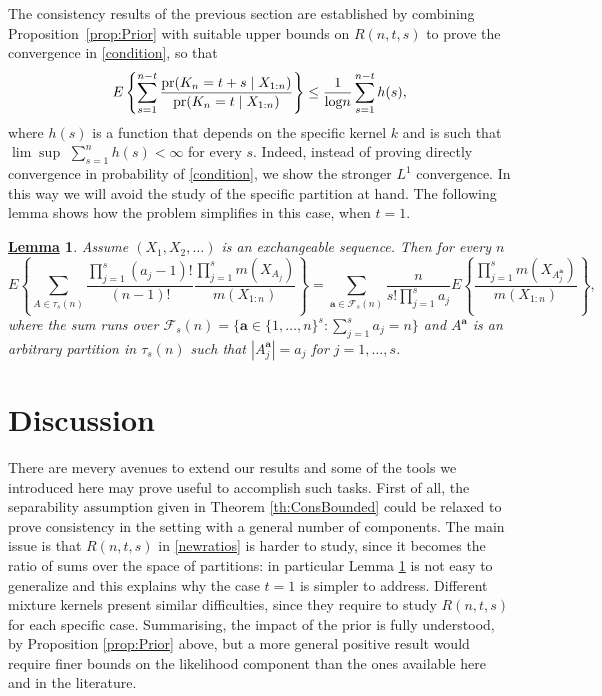 \documentclass[12pt]{article}
\newtheorem{Lem}{\underline{\bf Lemma}}
\def\log{\hbox{log}}
\begin{document}
The consistency results of the previous section are established by combining Proposition~\ref{prop:Prior} with suitable upper bounds on $R(n,t,s)$ to prove the convergence in \eqref{condition}, so that
\[
E \left\{ \sum_{s = 1}^{n-t} \frac{\text{\rm pr}(K_n = t+s \mid X_{1:n})}{\text{\rm pr}(K_n = t \mid X_{1:n})} \right\} \leq \frac{1}{\log n} \sum_{s = 1}^{n-t}h(s),
\]
where $h(s)$ is a %
function that depends on the specific kernel $k$ and is such that $\lim \sup$ $\sum_{s = 1}^{n}h(s) < \infty$ for every $s$. Indeed, instead of proving directly convergence in probability of \eqref{condition}, we show %
the stronger $L^1$ convergence. %
In this way we will avoid the study of the specific partition at hand. The following lemma shows how the problem simplifies in this case, when $t = 1$.
\begin{Lem}\label{suff_expectation}
Assume $(X_1,X_2,\dots)$ is an exchangeable sequence. Then for every $n$
\begin{equation*}
	E\left\{\sum_{A \in \tau_s(n)}\frac{\prod_{j=1}^s(a_j-1)!}{(n-1)!}\frac{\prod_{j=1}^s m(X_{A_j})}{m(X_{1:n})} \right\} = \sum_{\bm{a} \in \mathcal{F}_s(n)} \frac{n}{s! \prod_{j=1}^{s} a_j}  E\left\{ \frac{\prod_{j=1}^s m(X_{A^{\bm{a}}_j})}{m(X_{1:n})} \right\},
\end{equation*}
where the sum runs over $\mathcal{F}_s(n) = \{ \bm{a} \in \{1,\ldots,n\}^s: \sum_{j = 1}^s a_j=n\}$ and $A^{\bm{a}}$ is an arbitrary partition in $\tau_s(n)$ such that $|A_j^{\bm{a}}| = a_j$ for $j=1,\dots,s$. 
\end{Lem}
\section{Discussion}\label{discussion}
There are mevery avenues to extend our results and some of the tools we introduced here may prove useful to accomplish such tasks. First of all, 
the separability assumption given in Theorem \ref{th:ConsBounded} could be relaxed to prove consistency in the setting with a general number of components. The main issue is that $R(n,t,s)$ in \eqref{newratios} is harder to study, since it becomes the ratio of sums over the space of partitions: in particular Lemma \ref{suff_expectation} is not easy to generalize and this explains why the case $t = 1$ is simpler to address. 
Different mixture kernels present similar difficulties, since they require to study $R(n,t,s)$ for each specific case. Summarising, the impact of the prior is fully understood, by Proposition \ref{prop:Prior} above, but a more general positive result would require finer bounds on the likelihood component than the ones available here and in the literature.
\end{document}
